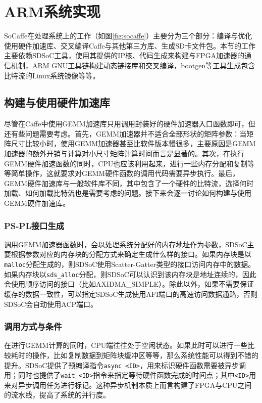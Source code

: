 \section{ARM系统实现}

SoCaffe在处理系统上的工作（如图\ref{fig:socaffe}）主要分为三个部分：编译与优化使用硬件加速库、交叉编译Caffe与其他第三方库、生成SD卡文件包。本节的工作主要依赖SDSoC工具，使用其提供的IP核、代码生成来构建与FPGA加速器的通信机制，ARM GNU工具链构建动态链接库和交叉编译，bootgen等工具生成包含比特流的Linux系统镜像等等。

\subsection{构建与使用硬件加速库}

尽管在Caffe中使用GEMM加速库只用调用封装好的硬件加速器入口函数即可，但还有些问题需要考虑。首先，GEMM加速器并不适合全部形状的矩阵参数：当矩阵尺寸比较小时，使用GEMM加速器甚至比软件版本慢很多，主要原因是GEMM加速器的额外开销与计算对小尺寸矩阵计算时间而言是显著的。其次，在执行GEMM硬件加速函数的同时，CPU也应该利用起来，进行一些内存分配和复制等等简单操作，这就要求对GEMM硬件函数的调用代码需要异步执行。最后，GEMM硬件加速库与一般软件库不同，其中包含了一个硬件的比特流，选择何时加载、如何加载比特流也是需要考虑的问题。接下来会逐一讨论如何构建与使用GEMM硬件加速库。

\subsubsection{PS-PL接口生成}
调用GEMM加速器函数时，会以处理系统分配好的内存地址作为参数，SDSoC主要根据参数对应的内存块的分配方式来确定生成什么样的接口。如果内存块是以\texttt{malloc}分配生成的，则SDSoC使用Scatter-Gatter类型的接口访问内存中的数据。如果内存块以\texttt{sds\_alloc}分配，则SDSoC可以认识到该内存块是地址连续的，因此会使用顺序访问的接口（比如AXIDMA\_SIMPLE）。除此以外，如果不需要保证缓存的数据一致性，可以指定SDSoC生成使用AFI端口的高速访问数据通路，否则SDSoC会自动使用ACP端口。

\subsubsection{调用方式与条件}

在进行GEMM计算的同时，CPU端往往处于空闲状态。如果此时可以进行一些比较耗时的操作，比如复制数据到矩阵块缓冲区等等，那么系统性能可以得到不错的提升。SDSoC提供了预编译指令\texttt{async <ID>}，用来标识硬件函数需要被异步调用；同时也提供了\texttt{wait <ID>}指令来指定等待硬件函数完成的时间点；其中\texttt{<ID>}用来对异步调用任务进行标记。这种异步机制本质上而言构建了FPGA与CPU之间的流水线，提高了系统的并行度。

